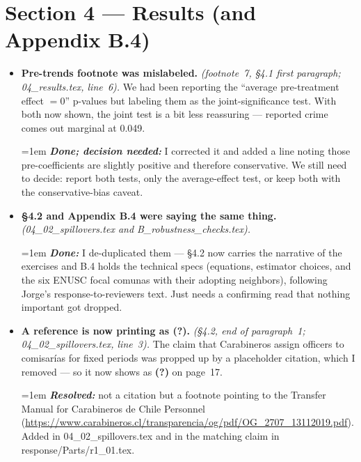 \documentclass[11pt]{article}
\newcommand{\where}[1]{{\small\textit{#1}}}
\newcommand{\fix}[1]{\smallskip\par\hangindent=1em \textbf{\itshape #1}}
\begin{document}
\section*{Section 4 --- Results (and Appendix B.4)}
\begin{itemize}
\item \textbf{Pre-trends footnote was mislabeled.} \where{(footnote~7, \S4.1 first paragraph; 04\_results.tex, line~6).} We had been reporting the ``average pre-treatment effect $=0$'' p-values but labeling them as the joint-significance test. With both now shown, the joint test is a bit less reassuring --- reported crime comes out marginal at 0.049.
\fix{Done; decision needed:} I corrected it and added a line noting those pre-coefficients are slightly positive and therefore conservative. We still need to decide: report both tests, only the average-effect test, or keep both with the conservative-bias caveat.
\item \textbf{\S4.2 and Appendix B.4 were saying the same thing.} \where{(04\_02\_spillovers.tex and B\_robustness\_checks.tex).}
\fix{Done:} I de-duplicated them --- \S4.2 now carries the narrative of the exercises and B.4 holds the technical specs (equations, estimator choices, and the six ENUSC focal comunas with their adopting neighbors), following Jorge's response-to-reviewers text. Just needs a confirming read that nothing important got dropped.
\item \textbf{A reference is now printing as (?).} \where{(\S4.2, end of paragraph~1; 04\_02\_spillovers.tex, line~3).} The claim that Carabineros assign officers to comisar\'ias for fixed periods was propped up by a placeholder citation, which I removed --- so it now shows as \textbf{(?)} on page~17.
\fix{Resolved:} not a citation but a footnote pointing to the Transfer Manual for Carabineros de Chile Personnel (\url{https://www.carabineros.cl/transparencia/og/pdf/OG_2707_13112019.pdf}). Added in 04\_02\_spillovers.tex and in the matching claim in response/Parts/r1\_01.tex.
\end{itemize}
\end{document}
